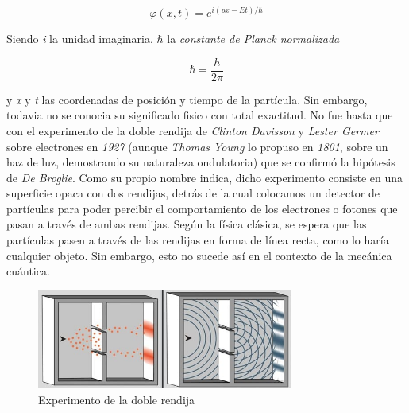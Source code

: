 \documentclass[12pt]{article}
\numberwithin{equation}{section} %
\begin{document}
        \vspace{5mm}

        \begin{equation}
            \varphi (x, t) = e^{i(px - Et) / \hbar}
            \label{eq: funcion_de_onda}
        \end{equation}

        \vspace{5mm}

        Siendo \textit{i} la unidad imaginaria, \( \hbar \) la \textit{constante de Planck normalizada}

        \vspace{5mm}

        \begin{equation}
            \hbar = \frac{h}{2\pi} 
            \label{constante_planck_normalizada}
        \end{equation}    

        \vspace{5mm}
        
        y \textit{x} y \textit{t} las coordenadas de posición y tiempo de la partícula. Sin embargo, todavia no se conocia su significado fisico con total exactitud. No fue hasta que con el experimento de la doble rendija de \textit{Clinton Davisson} y \textit{Lester Germer} sobre electrones en \textit{1927} (aunque \textit{Thomas Young} lo propuso en \textit{1801}, sobre un haz de luz, demostrando su naturaleza ondulatoria) que se confirmó la hipótesis de \textit{De Broglie}. Como su propio nombre indica, dicho experimento consiste en una superficie opaca con dos rendijas, detrás de la cual colocamos un detector de partículas para poder percibir el comportamiento de los electrones o fotones que pasan a través de ambas rendijas. Según la física clásica, se espera que las partículas pasen a través de las rendijas en forma de línea recta, como lo haría cualquier objeto. Sin embargo, esto no sucede así en el contexto de la mecánica cuántica.

        \vspace{5mm}

        \begin{figure}[h]
            \centering
            \includegraphics[width=0.75\textwidth]{img/Introduccion/doble_rendija.png}
            \caption{Experimento de la doble rendija}
            \label{fig: doble_rendija}
        \end{figure}
\end{document}
